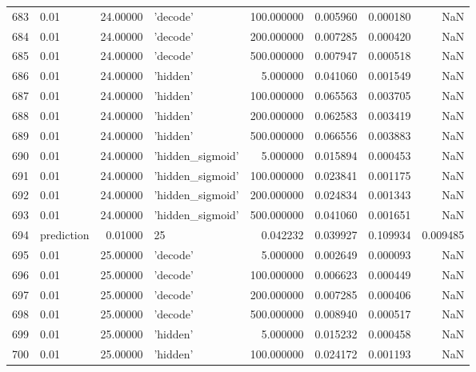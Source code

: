 \documentclass[10pt,a4paper]{article}
\begin{document}
\begin{tabular}{llrlrrrr}
683  &        0.01 &  24.00000 &           'decode' &  100.000000 &  0.005960 &  0.000180 &       NaN \\
684  &        0.01 &  24.00000 &           'decode' &  200.000000 &  0.007285 &  0.000420 &       NaN \\
685  &        0.01 &  24.00000 &           'decode' &  500.000000 &  0.007947 &  0.000518 &       NaN \\
686  &        0.01 &  24.00000 &           'hidden' &    5.000000 &  0.041060 &  0.001549 &       NaN \\
687  &        0.01 &  24.00000 &           'hidden' &  100.000000 &  0.065563 &  0.003705 &       NaN \\
688  &        0.01 &  24.00000 &           'hidden' &  200.000000 &  0.062583 &  0.003419 &       NaN \\
689  &        0.01 &  24.00000 &           'hidden' &  500.000000 &  0.066556 &  0.003883 &       NaN \\
690  &        0.01 &  24.00000 &   'hidden\_sigmoid' &    5.000000 &  0.015894 &  0.000453 &       NaN \\
691  &        0.01 &  24.00000 &   'hidden\_sigmoid' &  100.000000 &  0.023841 &  0.001175 &       NaN \\
692  &        0.01 &  24.00000 &   'hidden\_sigmoid' &  200.000000 &  0.024834 &  0.001343 &       NaN \\
693  &        0.01 &  24.00000 &   'hidden\_sigmoid' &  500.000000 &  0.041060 &  0.001651 &       NaN \\
694  &  prediction &   0.01000 &                 25 &    0.042232 &  0.039927 &  0.109934 &  0.009485 \\
695  &        0.01 &  25.00000 &           'decode' &    5.000000 &  0.002649 &  0.000093 &       NaN \\
696  &        0.01 &  25.00000 &           'decode' &  100.000000 &  0.006623 &  0.000449 &       NaN \\
697  &        0.01 &  25.00000 &           'decode' &  200.000000 &  0.007285 &  0.000406 &       NaN \\
698  &        0.01 &  25.00000 &           'decode' &  500.000000 &  0.008940 &  0.000517 &       NaN \\
699  &        0.01 &  25.00000 &           'hidden' &    5.000000 &  0.015232 &  0.000458 &       NaN \\
700  &        0.01 &  25.00000 &           'hidden' &  100.000000 &  0.024172 &  0.001193 &       NaN \\

\end{tabular}
\end{document}
